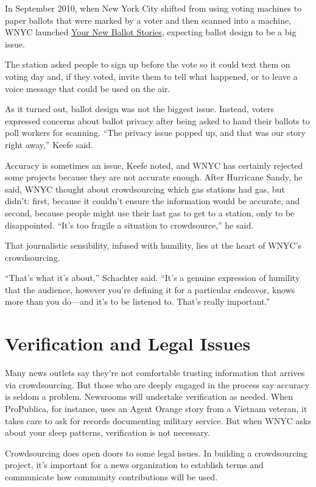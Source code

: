 \begin{itemize}
In September 2010, when New York City shifted from using voting machines to paper ballots that were marked by a voter and then scanned into a machine, WNYC launched \href{http://www.wnyc.org/story/94305-text-ballot-your-primary-day-reports/}{Your New Ballot Stories}, expecting ballot 
design to be a big issue.\autocite{Ballot} 

The station asked people to sign up before the vote so it could text them on voting day and, if they voted, invite them to tell what happened, or to leave a voice message that could be used on the air. 

As it turned out, ballot design was not the biggest issue. Instead, voters expressed concerns about ballot privacy after being asked to hand their ballots to poll workers for scanning. ``The privacy issue popped up, and that was our story right away,'' Keefe said.

Accuracy is sometimes an issue, Keefe noted, and WNYC has certainly rejected some projects because they are not accurate enough. After Hurricane Sandy, he said, WNYC thought about crowdsourcing which gas stations had gas, but didn’t: first, because it couldn’t ensure the information would be accurate, and second, because people might use their last gas to get to a station, only to be disappointed. ``It’s too fragile a situation to crowdsource,'' he said. 

That journalistic sensibility, infused with humility, lies at the heart of WNYC’s crowdsourcing.

``That’s what it’s about,'' Schachter said. ``It’s a genuine expression of humility that the audience, however you’re defining it for a particular endeavor, knows more than you do---and it’s to be listened to. That’s really important.''

\chapter{Verification and Legal Issues}

Many news outlets say they’re not comfortable trusting information that arrives via crowdsourcing. But those who are deeply engaged in the process say accuracy is seldom a problem. Newsrooms will undertake verification as needed. When ProPublica, for instance, uses an Agent Orange story from a Vietnam veteran, it takes care to ask for records documenting military service. But when WNYC asks about your sleep patterns, verification is not necessary.

Crowdsourcing does open doors to some legal issues. In building a crowdsourcing project, it’s important for a news organization to establish terms and communicate how community contributions will be used. 


\end{itemize}
